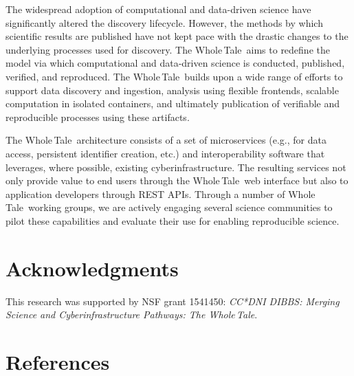 \documentclass{elsarticle}
\newcommand{\wt}{Whole\,Tale}
\begin{document}
The widespread adoption of computational and data-driven science have significantly
altered the discovery lifecycle. However, the methods by which scientific results are 
published have not kept pace with the drastic changes to the underlying processes used for discovery. 
The \wt\ aims to redefine the model via
which computational and data-driven science is conducted, published, 
verified, and reproduced. The \wt\ builds upon a wide range
of efforts to support data discovery and ingestion, 
analysis using flexible frontends, scalable
computation in isolated containers, and ultimately
publication of verifiable and reproducible processes
using these artifacts. 

The \wt\ architecture consists of a set
of microservices (e.g., for data
access, persistent identifier creation, etc.) and
interoperability software that leverages, where possible, 
existing cyberinfrastructure. The resulting services
not only provide value to end users through the \wt\ 
 web interface but also to application developers through
REST APIs. 
Through a number of \wt\ working groups, we are actively engaging several science communities
to pilot these capabilities and evaluate their use for
enabling reproducible science.

\section*{Acknowledgments}
This research was supported by NSF grant
1541450: \emph{CC*DNI DIBBS: Merging Science and Cyberinfrastructure Pathways: The \wt}.

\section*{References}

\small
%


\end{document}
